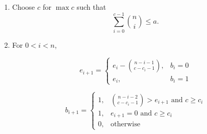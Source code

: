 \documentclass[a4paper,12pt]{article}
\begin{document}
\begin{enumerate}

\item Choose $c$ for $\max c$ such that
\begin{equation}
    \sum\limits_{i=0}^{c-1}\binom{n}{i}\leq a.
\end{equation}

\item For $0<i<n$,

\begin{equation}
    e_{i+1}=\begin{cases}
        e_i - \binom{n-i-1}{c-c_i-1}, & b_i=0 \\
        e_i, & b_i=1
    \end{cases}
\end{equation}

\begin{equation}
    b_{i+1}=\begin{cases}
        1, & \binom{n-i-2}{c-c_i-1} > e_{i+1} \text{ and } c \geq c_i \\
        1, & e_{i+1}=0 \text{ and } c \geq c_i \\
        0, & \text{otherwise}
    \end{cases}
\end{equation}

\end{enumerate}
\end{document}
